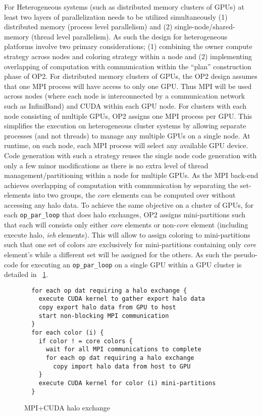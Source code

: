 \documentclass[11pt]{article}
\begin{document}
For Heterogeneous systems (such as distributed memory clusters of GPUs) at least two layers of parallelization needs to
be utilized simultaneously (1) distributed memory (process level parallelism) and (2) single-node/shared-memory (thread
level parallelism). As such the design for heterogeneous platforms involve two primary considerations; (1) combining the
owner compute strategy across nodes and coloring strategy within a node and (2) implementing overlapping of computation
with communication within the ``plan'' construction phase of OP2. For distributed memory clusters of GPUs, the OP2
design assumes that one MPI process will have access to only one GPU. Thus MPI will be used across nodes (where each
node is interconnected by a communication network such as InfiniBand) and CUDA within each GPU node. For clusters with
each node consisting of multiple GPUs, OP2 assigns one MPI process per GPU. This simplifies the execution on
heterogeneous cluster systems by allowing separate processes (and not threads) to manage any multiple GPUs on a single
node. At runtime, on each node, each MPI process will select any available GPU device. Code generation with such a
strategy reuses the single node code generation with only a few minor modifications as there is no extra level of thread
management/partitioning within a node for multiple GPUs. As the MPI back-end achieves overlapping of computation with
communication by separating the set-elements into two groups, the \textit{core} elements can be computed over without
accessing any halo data. To achieve the same objective on a cluster of GPUs, for each \texttt{op\_par\_loop} that does
halo exchanges, OP2 assigns mini-partitions such that each will consists only either \textit{core} elements or
non-\textit{core} element (including execute halo, \textit{ieh} elements). This will allow to assign coloring to
mini-partitions such that one set of colors are exclusively for mini-partitions containing only \textit{core} element's
while a different set will be assigned for the others. As such the pseudo-code for executing an \texttt{op\_par\_loop}
on a single GPU within a GPU cluster is detailed in \figurename{~\ref{fig:mpi_cuda_exchange}}.

\begin{figure}[t]\small
\begin{verbatim}
  for each op dat requiring a halo exchange {
    execute CUDA kernel to gather export halo data
    copy export halo data from GPU to host
    start non-blocking MPI communication
  }
  for each color (i) {
    if color ! = core colors {
      wait for all MPI communications to complete
      for each op dat requiring a halo exchange
        copy import halo data from host to GPU
    }
    execute CUDA kernel for color (i) mini-partitions
  }
\end{verbatim}
\caption{\small MPI+CUDA halo exchange}
\normalsize\vspace{-0pt}\label{fig:mpi_cuda_exchange}
\end{figure}
\end{document}

